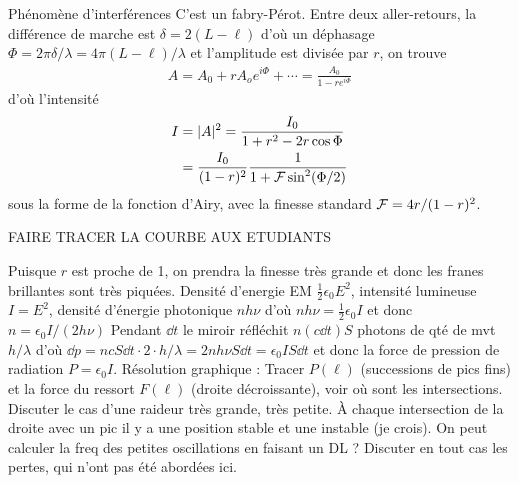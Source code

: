 \begin{solution}

\begin{questions}
    \questioncours Phénomène d'interférences
    \question C'est un fabry-Pérot. Entre deux aller-retours, la différence de marche est $\delta = 2(L-\ell)$ d'où un déphasage $\Phi = 2\pi \delta/\lambda = 4\pi(L-\ell)/\lambda$ et l'amplitude est divisée par $r$, on trouve 
    \begin{align}
        A = A_0 + r A_o e^{i\Phi} + \cdots= \frac{A_0}{1 - re^{i\Phi}}
    \end{align}
    d'où l'intensité 
    \begin{align}
        I &= |A|^2 = \frac{I_0}{1 + r^2 - 2r\cos\Phi} \\
        &= \frac{I_0}{(1-r)^2} \frac{1}{1 + \cal{F}\sin^2(\Phi/2)}
    \end{align}
    sous la forme de la fonction d'Airy, avec la finesse standard $\cal{F} = 4r/(1-r)^2$.
    
    FAIRE TRACER LA COURBE AUX ETUDIANTS

    Puisque $r$ est proche de 1, on prendra la finesse très grande et donc les franes brillantes sont très piquées.
    \question Densité d'energie EM $\frac12 \epsilon_0 E^2$, intensité lumineuse $I = E^2$, densité d'énergie photonique $n h \nu$ d'où $n h \nu = \frac12 \epsilon_0 I$ et donc $n =\epsilon_0 I/(2 h \nu)$
    \question Pendant $\dd{t}$ le miroir réfléchit $n (c\dd{t}) S$ photons de qté de mvt $h/\lambda$ d'où $\dd{p} = n c S \dd{t} \cdot 2 \cdot h/\lambda = 2 n h \nu S \dd{t} =\epsilon_0 I S \dd{t}$ et donc la force de pression de radiation $P = \epsilon_0 I$.
    \question Résolution graphique : Tracer $P(\ell)$ (successions de pics fins) et la force du ressort $F(\ell)$ (droite décroissante), voir où sont les intersections. Discuter le cas d'une raideur très grande, très petite. À chaque intersection de la droite avec un pic il y a une position stable et une instable (je crois). On peut calculer la freq des petites oscillations en faisant un DL ? Discuter en tout cas les pertes, qui n'ont pas été abordées ici.
\end{questions}
\end{solution}
